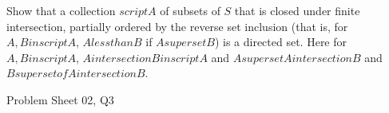 \begin{samepage}
\begin{ex}
Show that a collection $script A$ of subsets of $S$ that is closed under finite intersection, partially ordered by the reverse set inclusion (that is, for $A, B in script A$, $A less than B$ if $A superset B$) is a directed set. Here for $A,B in script A$, $A intersection B in script A$ and $A superset A intersection B$ and $B superset of A intersection B$.
\end{ex}
\begin{source}
Problem Sheet 02, Q3
\end{source}
\end{samepage}
